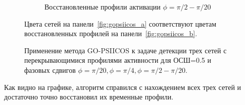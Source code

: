 \begin{figure}[htbp]
\begin{subfigure}[t]{0.4\textwidth}
        \caption{Восстановленные профили активации $\phi=\pi/2-\pi/20$}\label{fig:gopsiicos_f}
    \end{subfigure}
    \caption{Применение метода GO-PSIICOS к задаче детекции трех сетей с перекрывающимися профилями активности для ОСШ=0.5 и фазовых сдвигов $\phi=\pi/20, \phi=\pi/4, \phi=\pi/2-\pi/20$.}\label{fig:gopsiicos}
    Цвета сетей на панели~\ref{fig:gopsiicos_a} соответствуют цветам восстановленных
    профилей на панели~\ref{fig:gopsiicos_b}.
\end{figure}

Как видно на графике, алгоритм справился с нахождением всех трех сетей и достаточно
точно восстановил их временные профили.
